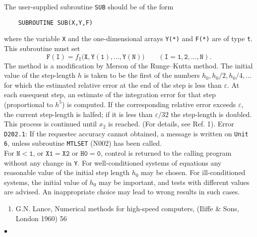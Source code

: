 The user-supplied subroutine {\tt SUB} should be of the form
\begin{verbatim}
    SUBROUTINE SUB(X,Y,F)
\end{verbatim}
where the variable {\tt X} and the one-dimensional arrays {\tt Y(*)}
and {\tt F(*)} are of type {\tt t}. This subroutine must set
$$\mathtt{F(I)} = f_{\mathtt{I}}(\mathtt{X,Y(1),\ldots,Y(N))} \qquad
(\mathtt{I = 1,2,\ldots,N}).$$
\newpage
\Method
The method is a modification by Merson of the Runge--Kutta method.
The initial value of the step-length $h$ is taken to be the first of the
numbers $h_0, h_0/2, h_0/4, \ldots$ for which the estimated relative
error at the end of the step is less than $\varepsilon$.
At each susequent
step, an estimate of the integration error for that step (proportional to
$h^5$) is computed. If the corresponding relative error exceeds
$\varepsilon$, the current step-length is halfed; if it is less than
$\varepsilon/32$ the step-length is doubled. This process is
continued
until $x_2$ is reached. (For details, see Ref. 1).
\Errorh
Error {\tt D202.1}: If the requestec accuracy cannot obtained,
a message is written on
{\tt Unit 6}, unless subroutine {\tt MTLSET} (N002) has been called. \\
For $\mathtt{N<1}$, or $\mathtt{X1=X2}$ or $\mathtt{H0=0}$, control
is returned to the calling program without any change in {\tt Y}.
\Notes
For well-conditioned systems of equations any reasonable value of the
initial step length $h_0$ may be chosen. For ill-conditioned systems,
the initial value of $h_0$ may be important, and tests with different
values are advised. An inappropriate choice may lead to wrong results in
such cases.
\Refer
\begin{enumerate}
\item  G.N. Lance, Numerical methods for high-speed computers,
(Iliffe \& Sons, London 1960) 56
\end{enumerate}
$\bullet$
